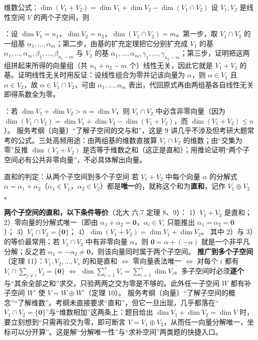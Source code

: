 
\begin{fdeep}{维数公式：$\dim(V_1+V_2)=\dim V_1+\dim V_2-\dim(V_1\cap V_2)$}
设 $V_1,V_2$ 是线性空间 $V$ 的两个子空间，则

：设 $\dim V_1=n_1$，$\dim V_2=n_2$，$\dim(V_1\cap V_2)=m$。第一步，取 $V_1\cap V_2$ 的一组基 $\alpha_1,\dots,\alpha_m$；第二步，由基的扩充定理把它分别扩充成 $V_1$ 的基 $\alpha_1,\dots,\alpha_m,\beta_1,\dots,\beta_{n_1-m}$ 与 $V_2$ 的基 $\alpha_1,\dots,\alpha_m,\gamma_1,\dots,\gamma_{n_2-m}$；第三步，证明把这两组拼起来所得的向量组（共 $n_1+n_2-m$ 个）线性无关，因此它就是 $V_1+V_2$ 的基。证明线性无关时用反证：设线性组合为零并记该向量为 $\alpha$，则 $\alpha\in V_1$ 且 $\alpha\in V_2$，故 $\alpha\in V_1\cap V_2$，可由 $\alpha_1,\dots,\alpha_m$ 表出，代回原式再由两组基各自线性无关即得系数全为零。

：若 $\dim V_1+\dim V_2>n=\dim V$，则 $V_1\cap V_2$ 中必含非零向量（因为 $\dim(V_1\cap V_2)=\dim V_1+\dim V_2-\dim(V_1+V_2)$，而 $\dim(V_1+V_2)\le n$）。
\fbref{}服务考纲〔向量〕“了解子空间的交与和”，这是 9 讲几乎不涉及但考研大题常考的公式。三处高频用途：由两组基的维数直接算 $V_1\cap V_2$ 的维数；由“交集为零”反推 $\dim(V_1+V_2)$ 是否等于维数之和（这正是直和）；用推论证明“两个子空间必有公共非零向量”，不必具体解出向量。
\end{fdeep}

\begin{fdeep}{直和的判定：从两个子空间到多个子空间}
若 $V_1+V_2$ 中每个向量 $\alpha$ 的分解式 $\alpha=\alpha_1+\alpha_2$（$\alpha_1\in V_1$，$\alpha_2\in V_2$）都是\textbf{唯一}的，就称这个和为\textbf{直和}，记作 $V_1\oplus V_2$。

\textbf{两个子空间的直和，以下条件等价}（北大 六.7 定理 8、9）：
1）$V_1+V_2$ 是直和；
2）零向量的分解式唯一（即由 $\alpha_1+\alpha_2=\mathbf{0}$，$\alpha_i\in V_i$ 只能推出 $\alpha_1=\alpha_2=\mathbf{0}$）；
3）$V_1\cap V_2=\{\mathbf{0}\}$；
4）$\dim(V_1+V_2)=\dim V_1+\dim V_2$。
其中 2）与 3）的等价最常用：若 $V_1\cap V_2$ 中有非零向量 $\alpha$，则 $\mathbf{0}=\alpha+(-\alpha)$ 就是一个非平凡分解；反之若 $\alpha_1=-\alpha_2\ne\mathbf{0}$，则该向量同时属于两个子空间。
\textbf{推广到多个子空间}（定理 11）：$V_1,V_2,\dots,V_s$ 的和是直和 $\iff$ 零向量表法唯一 $\iff$ 对每个 $i$ 都有 $V_i\cap\sum_{j\ne i}V_j=\{\mathbf{0}\}$ $\iff$ $\dim\sum_{i=1}^{s}V_i=\sum_{i=1}^{s}\dim V_i$。多子空间时必须\textbf{逐个}与“其余全部之和”求交，只验两两之交为零是不够的。此外任一子空间 $W$ 都有补子空间 $W'$ 使 $V=W\oplus W'$（定理 10）。
\fbref{}服务考纲〔向量〕“了解子空间的概念”“了解维数”。考纲未直接要求“直和”，但它一旦出现，几乎都落在“$V_1\cap V_2=\{\mathbf{0}\}$”与“维数相加”这两条上：题目给出 $\dim V_1+\dim V_2=\dim V$ 时，要立刻想到“只需再验交为零，即可断言 $V=V_1\oplus V_2$，从而任一向量分解唯一，坐标可以分开算”。这是解“分解唯一性”与“求补空间”两类题的快捷入口。
\end{fdeep}

